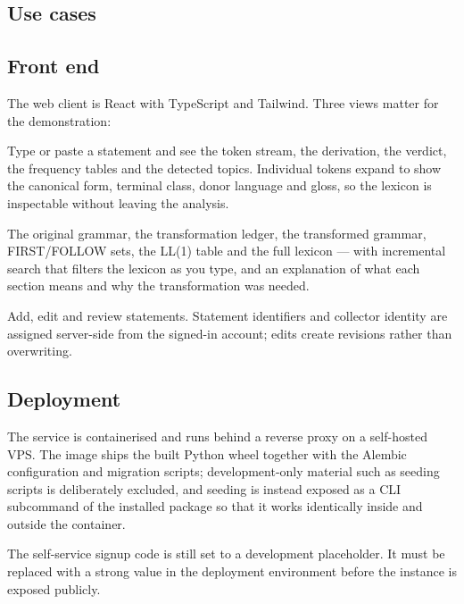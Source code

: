 \subsection{Use cases}


\subsection{Front end}

The web client is React with TypeScript and Tailwind. Three views matter for the
demonstration:

\begin{description}[leftmargin=1.4em, style=nextline]
  \item[Analyser] Type or paste a statement and see the token stream, the derivation, the
    verdict, the frequency tables and the detected topics. Individual tokens expand to show
    the canonical form, terminal class, donor language and gloss, so the lexicon is
    inspectable without leaving the analysis.
  \item[Grammar explorer] The original grammar, the transformation ledger, the transformed
    grammar, FIRST/FOLLOW sets, the LL(1) table and the full lexicon --- with incremental
    search that filters the lexicon as you type, and an explanation of what each section
    means and why the transformation was needed.
  \item[Corpus manager] Add, edit and review statements. Statement identifiers and
    collector identity are assigned server-side from the signed-in account; edits create
    revisions rather than overwriting.
\end{description}

\subsection{Deployment}

The service is containerised and runs behind a reverse proxy on a self-hosted VPS. The
image ships the built Python wheel together with the Alembic configuration and migration
scripts; development-only material such as seeding scripts is deliberately excluded, and
seeding is instead exposed as a CLI subcommand of the installed package so that it works
identically inside and outside the container.

\begin{limitbox}
The self-service signup code is still set to a development placeholder. It must be replaced
with a strong value in the deployment environment before the instance is exposed publicly.
\end{limitbox}
